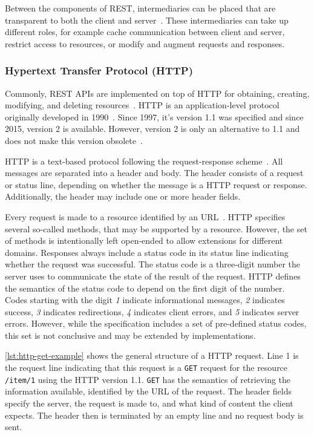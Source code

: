 Between the components of \ac{REST}, intermediaries can be placed that are transparent to both the client and server~\cite{Fielding2000}.
These intermediaries can take up different roles, for example cache communication between client and server, restrict access to resources, or modify and augment requests and responses.

\subsubsection{Hypertext Transfer Protocol (\acs{HTTP})}\label{sec:foundations:http}

Commonly, \ac{REST} \acp{API} are implemented on top of \ac{HTTP} for obtaining, creating, modifying, and deleting resources~\cite{Schermann2015}.
\ac{HTTP} is an application-level protocol originally developed in 1990~\cite{RFC2068}.
Since 1997, it's version 1.1 was specified and since 2015, version 2 is available.
However, version 2 is only an alternative to 1.1 and does not make this version obsolete~\cite{RFC7540}.

\ac{HTTP} is a text-based protocol following the request-response scheme~\cite{RFC2068}.
All messages are separated into a header and body.
The header consists of a request or status line, depending on whether the message is a \ac{HTTP} request or response.
Additionally, the header may include one or more header fields.

Every request is made to a resource identified by an \ac{URL}~\cite{RFC2068}.
\ac{HTTP} specifies several so-called methods, that may be supported by a resource.
However, the set of methods is intentionally left open-ended to allow extensions for different domains.
Responses always include a status code in its status line indicating whether the request was successful.
The status code is a three-digit number the server uses to communicate the state of the result of the request.
\ac{HTTP} defines the semantics of the status code to depend on the first digit of the number.
Codes starting with the digit \textit{1} indicate informational messages, \textit{2} indicates success, \textit{3} indicates redirections, \textit{4} indicates client errors, and \textit{5} indicates server errors.
However, while the specification includes a set of pre-defined status codes, this set is not conclusive and may be extended by implementations.

\autoref{lst:http-get-example} shows the general structure of a \ac{HTTP} request.
Line 1 is the request line indicating that this request is a \texttt{GET} request for the resource \texttt{/item/1} using the \ac{HTTP} version 1.1.
\texttt{GET} has the semantics of retrieving the information available, identified by the \ac{URL} of the request.
The header fields specify the server, the request is made to, and what kind of content the client expects.
The header then is terminated by an empty line and no request body is sent.

